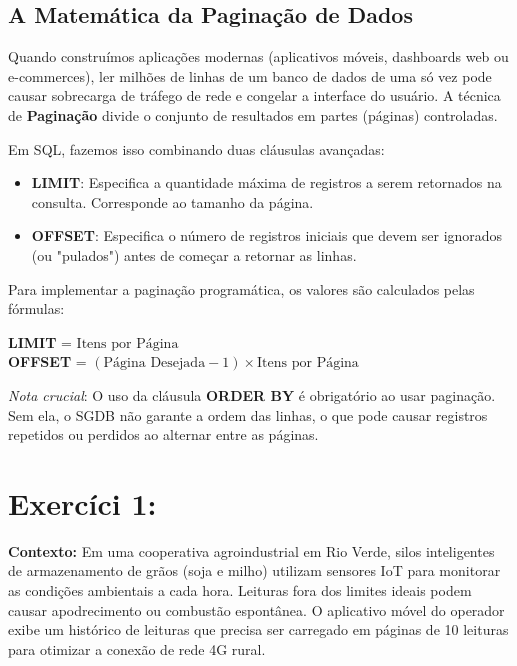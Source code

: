 \documentclass[12pt,a4paper]{article}
\begin{document}
\vspace{0.4cm}

\subsection*{A Matemática da Paginação de Dados}
Quando construímos aplicações modernas (aplicativos móveis, dashboards web ou e-commerces), ler milhões de linhas de um banco de dados de uma só vez pode causar sobrecarga de tráfego de rede e congelar a interface do usuário. A técnica de \textbf{Paginação} divide o conjunto de resultados em partes (páginas) controladas.

Em SQL, fazemos isso combinando duas cláusulas avançadas:
\begin{itemize}
    \item \textbf{LIMIT}: Especifica a quantidade máxima de registros a serem retornados na consulta. Corresponde ao tamanho da página.
    \item \textbf{OFFSET}: Especifica o número de registros iniciais que devem ser ignorados (ou "pulados") antes de começar a retornar as linhas.
\end{itemize}

Para implementar a paginação programática, os valores são calculados pelas fórmulas:
\begin{center}
    \large
    \textbf{LIMIT} = $\text{Itens por Página}$ \\
    \textbf{OFFSET} = $(\text{Página Desejada} - 1) \times \text{Itens por Página}$
\end{center}

\textit{Nota crucial}: O uso da cláusula \textbf{ORDER BY} é obrigatório ao usar paginação. Sem ela, o SGDB não garante a ordem das linhas, o que pode causar registros repetidos ou perdidos ao alternar entre as páginas.



\section*{Exercíci 1:}

\textbf{Contexto:} Em uma cooperativa agroindustrial em Rio Verde, silos inteligentes de armazenamento de grãos (soja e milho) utilizam sensores IoT para monitorar as condições ambientais a cada hora. Leituras fora dos limites ideais podem causar apodrecimento ou combustão espontânea. O aplicativo móvel do operador exibe um histórico de leituras que precisa ser carregado em páginas de 10 leituras para otimizar a conexão de rede 4G rural.
\end{document}
